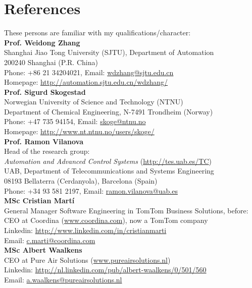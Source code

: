 \documentclass[a4paper]{article}
\begin{document}
\pagebreak

\section{References}

\noindent These persons are familiar with my qualifications/character:\\


\textbf{Prof. Weidong Zhang} \\
Shanghai Jiao Tong University (SJTU), Department of Automation\\
200240 Shanghai (P.R. China)\\
Phone: +86 21 34204021, Email: \url{wdzhang@sjtu.edu.cn}\\
Homepage: \url{http://automation.sjtu.edu.cn/wdzhang/}\\


\textbf{Prof. Sigurd Skogestad} \\
Norwegian University of Science and Technology (NTNU) \\
Department of Chemical Engineering, N-7491 Trondheim (Norway)\\
Phone: +47 735 94154, Email: \url{skoge@ntnu.no} \\
Homepage: \url{http://www.nt.ntnu.no/users/skoge/}\\


\textbf{Prof. Ramon Vilanova} \\
Head of the research group:\\
\emph{Automation and Advanced Control Systems} (\url{http://tes.uab.es/TC})\\
UAB, Department of Telecommunications and Systems Engineering\\
08193 Bellaterra (Cerdanyola), Barcelona (Spain) \\
Phone: +34 93 581 2197, Email: \url{ramon.vilanova@uab.es} \\


\textbf{MSc Cristian Martí} \\
General Manager Software Engineering in TomTom Business Solutions, before:
CEO at Coordina (\url{www.coordina.com}), now a TomTom company\\
Linkedin: \url{http://www.linkedin.com/in/cristianmarti}\\
Email: \url{c.marti@coordina.com}\\

\textbf{MSc Albert Waalkens} \\
CEO at Pure Air Solutions (\url{www.pureairsolutions.nl})\\
Linkedin: \url{http://nl.linkedin.com/pub/albert-waalkens/0/501/560}\\
Email:  \url{a.waalkens@pureairsolutions.nl} \\
\end{document}
